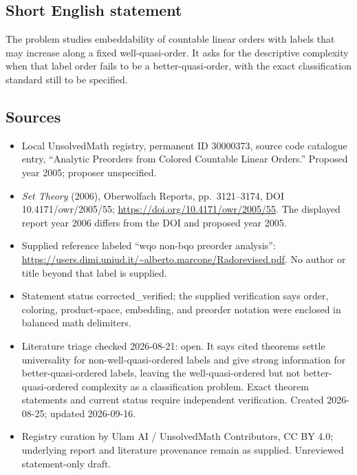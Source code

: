 \documentclass[11pt]{article}
\begin{document}
\subsection{Short English statement}
The problem studies embeddability of countable linear orders with labels that may increase along a fixed well-quasi-order. It asks for the descriptive complexity when that label order fails to be a better-quasi-order, with the exact classification standard still to be specified.
\subsection{Sources}
\begin{itemize}
\item Local UnsolvedMath registry, permanent ID 30000373, source code catalogue entry, ``Analytic Preorders from Colored Countable Linear Orders.'' Proposed year 2005; proposer unspecified.
\item \emph{Set Theory} (2006), Oberwolfach Reports, pp.\ 3121--3174, DOI 10.4171/owr/2005/55; \url{https://doi.org/10.4171/owr/2005/55}. The displayed report year 2006 differs from the DOI and proposed year 2005.
\item Supplied reference labeled ``wqo non-bqo preorder analysis'': \url{https://users.dimi.uniud.it/~alberto.marcone/Radorevised.pdf}. No author or title beyond that label is supplied.
\item Statement status corrected\_verified; the supplied verification says order, coloring, product-space, embedding, and preorder notation were enclosed in balanced math delimiters.
\item Literature triage checked 2026-08-21: open. It says cited theorems settle universality for non-well-quasi-ordered labels and give strong information for better-quasi-ordered labels, leaving the well-quasi-ordered but not better-quasi-ordered complexity as a classification problem. Exact theorem statements and current status require independent verification. Created 2026-08-25; updated 2026-09-16.
\item Registry curation by Ulam AI / UnsolvedMath Contributors, CC BY 4.0; underlying report and literature provenance remain as supplied. Unreviewed statement-only draft.
\end{itemize}
\end{document}
